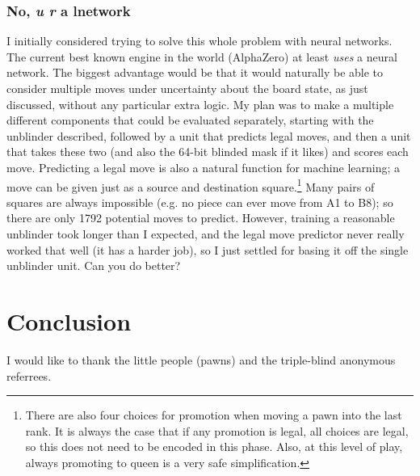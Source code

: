 \documentclass[twocolumn]{amsart}
\begin{document}
\subsubsection{No, {\em u r} a lnetwork} \label{sec:legalmove}
I initially considered trying to solve this whole problem with neural
networks. The current best known engine in the world (AlphaZero) at
least {\em uses} a neural network.
The biggest advantage would be that it would naturally be able to
consider multiple moves under uncertainty about the board state, as
just discussed, without any particular extra logic. My plan was to
make a multiple different components that could be evaluated
separately, starting with the unblinder described, followed by a unit
that predicts legal moves, and then a unit that takes these two (and
also the 64-bit blinded mask if it likes) and scores each move.
Predicting a legal move is also a natural function for machine
learning; a move can be given just as a source and destination
square.\footnote{ There are also four choices for promotion when
  moving a pawn into the last rank. It is always the case that if any
  promotion is legal, all choices are legal, so this does not need to
  be encoded in this phase. Also, at this level of play, always
  promoting to queen is a very safe simplification.} Many pairs of
squares are always impossible (e.g. no piece can ever move from A1 to
B8); so there are only 1792 potential moves to predict. However,
training a reasonable unblinder took longer than I expected, and the
legal move predictor never really worked that well (it has a harder
job),
so I just settled for basing it off the single unblinder unit. Can you
do better?

\section{Conclusion}
% 

I would like to thank the little people (pawns) and the triple-blind
anonymous referrees.
\end{document}
